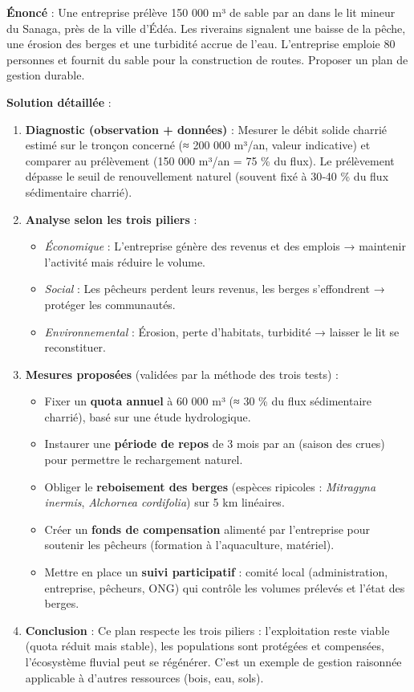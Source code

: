\documentclass[11pt]{article}
\begin{document}
\begin{exoresolu}
\textbf{Énoncé} : Une entreprise prélève 150 000 m³ de sable par an dans le lit mineur du Sanaga, près de la ville d'Édéa. Les riverains signalent une baisse de la pêche, une érosion des berges et une turbidité accrue de l'eau. L'entreprise emploie 80 personnes et fournit du sable pour la construction de routes. Proposer un plan de gestion durable.

\tcblower
\textbf{Solution détaillée} :

\begin{enumerate}
\item \textbf{Diagnostic (observation + données)} : Mesurer le débit solide charrié estimé sur le tronçon concerné (≈ 200 000 m³/an, valeur indicative) et comparer au prélèvement (150 000 m³/an = 75 \% du flux). Le prélèvement dépasse le seuil de renouvellement naturel (souvent fixé à 30‑40 \% du flux sédimentaire charrié).
\item \textbf{Analyse selon les trois piliers} :
\begin{itemize}
\item \textit{Économique} : L'entreprise génère des revenus et des emplois → maintenir l'activité mais réduire le volume.
\item \textit{Social} : Les pêcheurs perdent leurs revenus, les berges s'effondrent → protéger les communautés.
\item \textit{Environnemental} : Érosion, perte d'habitats, turbidité → laisser le lit se reconstituer.
\end{itemize}
\item \textbf{Mesures proposées} (validées par la méthode des trois tests) :
\begin{itemize}
\item Fixer un \textbf{quota annuel} à 60 000 m³ (≈ 30 \% du flux sédimentaire charrié), basé sur une étude hydrologique.
\item Instaurer une \textbf{période de repos} de 3 mois par an (saison des crues) pour permettre le rechargement naturel.
\item Obliger le \textbf{reboisement des berges} (espèces ripicoles : \emph{Mitragyna inermis}, \emph{Alchornea cordifolia}) sur 5 km linéaires.
\item Créer un \textbf{fonds de compensation} alimenté par l'entreprise pour soutenir les pêcheurs (formation à l'aquaculture, matériel).
\item Mettre en place un \textbf{suivi participatif} : comité local (administration, entreprise, pêcheurs, ONG) qui contrôle les volumes prélevés et l'état des berges.
\end{itemize}
\item \textbf{Conclusion} : Ce plan respecte les trois piliers : l'exploitation reste viable (quota réduit mais stable), les populations sont protégées et compensées, l'écosystème fluvial peut se régénérer. C'est un exemple de gestion raisonnée applicable à d'autres ressources (bois, eau, sols).
\end{enumerate}
\end{exoresolu}
\end{document}
